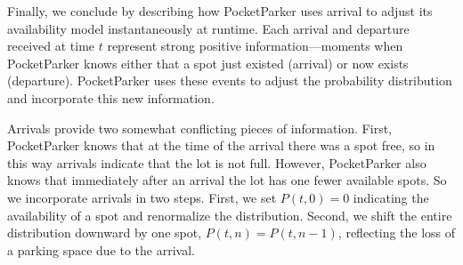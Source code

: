 Finally, we conclude by describing how PocketParker uses arrival to adjust
its availability model instantaneously at runtime. Each arrival and departure
received at time $t$ represent strong positive information---moments when
PocketParker knows either that a spot just existed (arrival) or now exists
(departure). PocketParker uses these events to adjust the probability
distribution and incorporate this new information. 

Arrivals provide two somewhat conflicting pieces of information. First,
PocketParker knows that at the time of the arrival there was a spot free, so
in this way arrivals indicate that the lot is not full. However, PocketParker
also knows that immediately after an arrival the lot has one fewer available
spots. So we incorporate arrivals in two steps. First, we set $P(t, 0) = 0$
indicating the availability of a spot and renormalize the distribution.
Second, we shift the entire distribution downward by one spot, $P(t, n) =
P(t, n - 1)$, reflecting the loss of a parking space due to the arrival.

